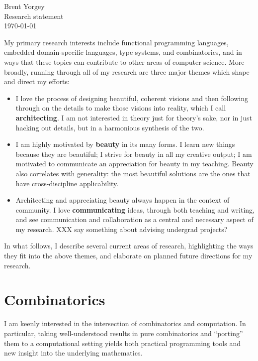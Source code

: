 \documentclass[12pt]{article}
\begin{document}
\noindent Brent Yorgey \\
Research statement \\
\today
\bigskip

My primary research interests include functional programming
languages, embedded domain-specific languages, type systems, and
combinatorics, and in ways that these topics can contribute to other
areas of computer science.  More broadly, running through all of my
research are three major themes which shape and direct my efforts:

\begin{itemize}
\item I love the process of designing beautiful, coherent visions and
  then following through on the details to make those visions into
  reality, which I call \textbf{architecting}.  I am not interested in
  theory just for theory's sake, nor in just hacking out details, but
  in a harmonious synthesis of the two.
\item I am highly motivated by \textbf{beauty} in its many forms.  I
  learn new things because they are beautiful; I strive for beauty in
  all my creative output; I am motivated to communicate an
  appreciation for beauty in my teaching.  Beauty also correlates
  with generality: the most beautiful solutions are the ones that have
  cross-discipline applicability.
\item Architecting and appreciating beauty always happen in the
  context of community.  I love \textbf{communicating} ideas, through
  both teaching and writing, and see communication and collaboration
  as a central and necessary aspect of my research. XXX say something
  about advising undergrad projects?
\end{itemize}

In what follows, I describe several current areas of research,
highlighting the ways they fit into the above themes, and elaborate on
planned future directions for my research.

\section*{Combinatorics}
\label{sec:combinatorics}

I am keenly interested in the intersection of combinatorics and
computation.  In particular, taking well-understood results in pure
combinatorics and ``porting'' them to a computational setting yields
both practical programming tools and new insight into the underlying
mathematics.
\end{document}
